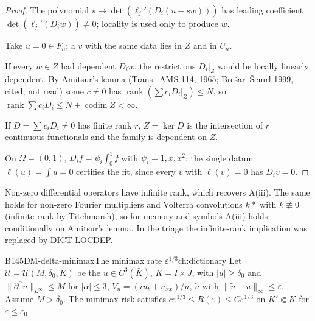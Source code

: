 \begin{proof}
The polynomial $s\mapsto\det(\ell_j'(D_i(u+sw)))$ has leading coefficient $\det(\ell_j'(D_iw))\ne0$; locality is used only to produce $w$.

Take $u=0\in F_n$; a $v$ with the same data lies in $Z$ and in $U_n$.

If every $w\in Z$ had dependent $D_iw$, the restrictions $D_i|_Z$ would be locally linearly dependent. By Amitsur's lemma (Trans.\ AMS 114, 1965; Bre\v sar--\v Semrl 1999, cited, not read) some $c\ne0$ has $\operatorname{rank}(\sum c_iD_i|_Z)\le N$, so $\operatorname{rank}\sum c_iD_i\le N+\operatorname{codim}Z<\infty$.

If $D=\sum c_iD_i\ne0$ has finite rank $r$, $Z=\ker D$ is the intersection of $r$ continuous functionals and the family is dependent on $Z$.

On $\Omega=(0,1)$, $D_if=\psi_i\int_0^1f$ with $\psi_i=1,x,x^2$: the single datum $\ell(u)=\int u=0$ certifies the fit, since every $v$ with $\ell(v)=0$ has $D_iv=0$.

\end{proof}

\begin{caution}[title=Consequence]
Non-zero differential operators have infinite rank, which recovers A(iii). The same holds for non-zero Fourier multipliers and Volterra convolutions $k*$ with $k\not\equiv0$ (infinite rank by Titchmarsh), so for memory and symbols A(iii) holds conditionally on Amitsur's lemma. In the triage the infinite-rank implication was replaced by DICT-LOCDEP.
\end{caution}

\begin{dimcard}{B145}{DM-delta-minimax}{The minimax rate $\varepsilon^{1/3}$}{\pw}{ch:dictionary}
Let $\mathcal U=\mathcal U(M,\delta_0,K)$ be the $u\in C^3(\bar K)$, $K=I\times J$, with $|u|\ge\delta_0$ and $\|\partial^\alpha u\|_{L^\infty}\le M$ for $|\alpha|\le3$, $V_u=(iu_t+u_{xx})/u$, $\tilde u$ with $\|\tilde u-u\|_\infty\le\varepsilon$. Assume $M>\delta_0$. The minimax risk satisfies $c\varepsilon^{1/3}\le R(\varepsilon)\le C\varepsilon^{1/3}$ on $K'\Subset K$ for $\varepsilon\le\varepsilon_0$.
\end{dimcard}

